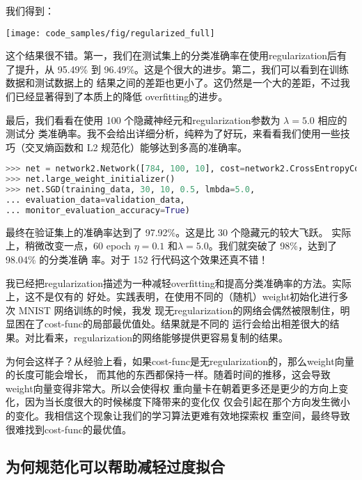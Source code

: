 我们得到：
\begin{center}
  \texttt{[image: code\_samples/fig/regularized\_full]}
\end{center}

这个结果很不错。第一，我们在测试集上的分类准确率在使用\gls*{regularization}后有了提升，从
95.49\% 到 96.49\%。这是个很大的进步。第二，我们可以看到在训练数据和测试数据上的
结果之间的差距也更小了。这仍然是一个大的差距，不过我们已经显著得到了本质上的降低
\gls*{overfitting}的进步。

最后，我们看看在使用 100 个隐藏神经元和\gls*{regularization}参数为 $\lambda = 5.0$ 相应的测试分
类准确率。我不会给出详细分析，纯粹为了好玩，来看看我们使用一些技巧（交叉熵函数和
  L2 规范化）能够达到多高的准确率。

\begin{lstlisting}[language=Python]
>>> net = network2.Network([784, 100, 10], cost=network2.CrossEntropyCost)
>>> net.large_weight_initializer()
>>> net.SGD(training_data, 30, 10, 0.5, lmbda=5.0,
... evaluation_data=validation_data,
... monitor_evaluation_accuracy=True)
\end{lstlisting}

最终在验证集上的准确率达到了 97.92\%。这是比 30 个隐藏元的较大飞跃。
\label{chap3_98_04_percent}实际上，稍微改变一点，60 \gls*{epoch}
$\eta=0.1$ 和$\lambda = 5.0$。我们就突破了 98\%，达到了98.04\% 的分类准确
率\label{98percent}。对于 152 行代码这个效果还真不错！

我已经把\gls*{regularization}描述为一种减轻\gls*{overfitting}和提高分类准确率的方法。实际上，这不是仅有的
好处。实践表明，在使用不同的（随机）\gls*{weight}初始化进行多次 MNIST 网络训练的时候，我发
现无\gls*{regularization}的网络会偶然被限制住，明显困在了\gls*{cost-func}的局部最优值处。结果就是不同的
运行会给出相差很大的结果。对比看来，\gls*{regularization}的网络能够提供更容易复制的结果。

为何会这样子？从经验上看，如果\gls*{cost-func}是无\gls*{regularization}的，那么\gls*{weight}向量的长度可能会增长，
而其他的东西都保持一样。随着时间的推移，这会导致\gls*{weight}向量变得非常大。所以会使得权
重向量卡在朝着更多还是更少的方向上变化，因为当长度很大的时候梯度下降带来的变化仅
仅会引起在那个方向发生微小的变化。我相信这个现象让我们的学习算法更难有效地探索权
重空间，最终导致很难找到\gls*{cost-func}的最优值。

\subsection{为何规范化可以帮助减轻过度拟合}

